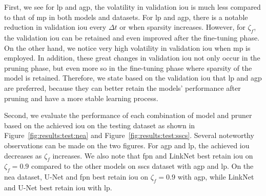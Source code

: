 \documentclass[mathematics,article,submit,pdftex,moreauthors]{Definitions/mdpi}
\begin{document}
First, we see for \ac{lp} and \ac{agp},
the volatility in validation \ac{iou} is much less
compared to that of \ac{mp} in both models and datasets.
For \ac{lp} and \ac{agp}, there is a 
notable reduction in validation \ac{iou}
every $\Delta t$ or when sparsity increases.
However, for $\zeta_f$, the validation \ac{iou}
can be retained and even improved after the fine-tuning phase.
On the other hand, we notice very high volatility
in validation \ac{iou} when \ac{mp} is employed.
In addition, these great changes in validation \ac{iou}
not only occur in the pruning phase, but even more so
in the fine-tuning phase where sparsity
of the model is retained. Therefore, we
state based on the validation \ac{iou} that
\ac{lp} and \ac{agp} are preferred, because they can
better retain the models' performance 
after pruning and have a more stable learning process.

Second, we evaluate the performance of
each combination of model and pruner based on
the achieved \ac{iou} on the testing dataset
as shown in Figure~\ref{fig:results:test:nea}
and Figure~\ref{fig:results:test:sscs}. Several
noteworthy observations can be made on the
two figures. For \ac{agp} and \ac{lp},
the achieved \ac{iou} decreases as $\zeta_f$
increases. We also note that
\ac{fpn} and LinkNet best retain \ac{iou}
on $\zeta_f=0.9$ compared to the other models
on \ac{sscs} dataset with \ac{agp} and \ac{lp}.
On the \ac{nea}
dataset, U-Net and \ac{fpn} best retain \ac{iou}
on $\zeta_f=0.9$ with \ac{agp}, while LinkNet and
U-Net best retain \ac{iou} with \ac{lp}.
\end{document}
